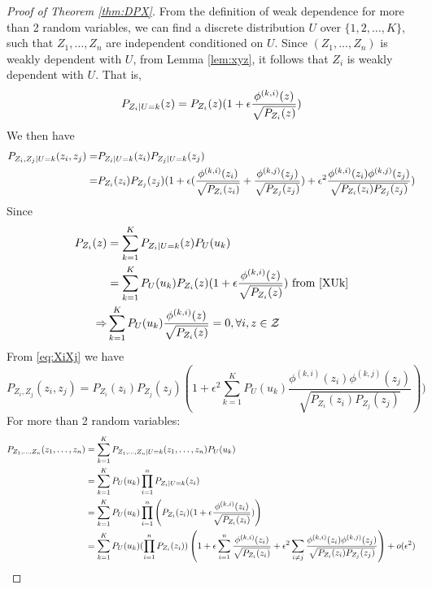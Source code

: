 \begin{proof}[Proof of Theorem \ref{thm:DPX}]
From the definition of weak dependence for more than 2 random variables, we can find a discrete distribution $U$ over $\{1, 2,\dots, K\}$, such that $Z_1, \dots, Z_n$ are independent conditioned on $U$. Since $(Z_1, \dots, Z_n)$ is weakly dependent with $U$, from Lemma \ref{lem:xyz}, it follows that $Z_i$ is weakly dependent with $U$.  That is, 
\begin{equation}\label{XUk}
P_{Z_i | U=k}(z) = P_{Z_i} (z)( 1 + \epsilon {\phi^{(k,i)}(z) \over \sqrt{P_{Z_i}(z)}} )
\end{equation}
We then have
\begin{align}
P_{Z_i, Z_j | U = k}(z_i, z_j)
=& P_{Z_i | U=k}(z_i)
P_{Z_j | U=k}(z_j) \notag \\
=& P_{Z_i}(z_i)P_{Z_j}(z_j)
(1 + \epsilon(\frac{\phi^{(k,i)}(z_i)}{\sqrt{P_{Z_i}(z_i)}}
+ \frac{\phi^{(k,j)}(z_j)}{\sqrt{P_{Z_j}(z_j)}}) +
\epsilon^2\frac{\phi^{(k,i)}(z_i)
	\phi^{(k,j)}(z_j)}{\sqrt{P_{Z_i}(z_i)P_{Z_j}(z_j)}})\label{eq:XiXj}
\end{align}
Since 
\begin{align*}
P_{Z_i}(z) &= \sum_{k=1}^{K} P_{Z_i | U=k}(z) P_U(u_k) \\
& =  \sum_{k=1}^{K}P_U(u_k)P_{Z_i} (z)( 1 + \epsilon {\phi^{(k,i)}(z) \over \sqrt{P_{Z_i}(z)}} ) \textrm{ from } \eqref{XUk}\\
\Rightarrow & \sum_{k=1}^{K} P_U(u_k){\phi^{(k, i)}(z) \over \sqrt{P_{Z_i}(z)}} =0,\forall i, z\in \mathcal{Z}
\end{align*}
From \eqref{eq:XiXj} we have
\begin{equation}\label{eq:PXiXj}
P_{Z_i, Z_j}(z_i, z_j) = P_{Z_i}(z_i)
P_{Z_j}(z_j) (1+\epsilon^2 \sum_{k=1}^K P_U(u_k)
\frac{\phi^{(k,i)}(z_i)
	\phi^{(k,j)}(z_j)}{\sqrt{P_{Z_i}(z_i)P_{Z_j}(z_j)}})
)
\end{equation}
For more than 2 random variables:
\begin{align*}
P_{Z_1,\dots,Z_n}(z_1,\dots,z_n)  &= \sum_{k=1}^{K} P_{Z_1,\dots,Z_n | U=k}(z_1,\dots,z_n) P_U(u_k) \\
&=  \sum_{k=1}^{K}P_U(u_k) \prod_{i=1}^n P_{Z_i|U=k}(z_i)\\
&= \sum_{k=1}^{K} P_U(u_k)\prod_{i=1}^n \left(P_{Z_i} (z_i)( 1 + \epsilon {\phi^{(k,i)}(z_i ) \over \sqrt{P_{Z_i}(z_i)}} )\right)\\
&=  \sum_{k=1}^{K}P_U(u_k) (\prod_{i=1}^n  P_{Z_i} (z_i))
\left( 1 + \epsilon\sum_{i=1}^n {\phi^{(k,i)}(z_i) \over \sqrt{P_{Z_i}(z_i)}} + \epsilon^2\sum_{i\neq j}{\phi^{(k,i)}(z_i)\phi^{(k,j)}(z_j)\over \sqrt{P_{Z_i}(z_i)P_{Z_j}(z_j)} }\right)+o(\epsilon^2) \\

\end{align*}
\end{proof}
